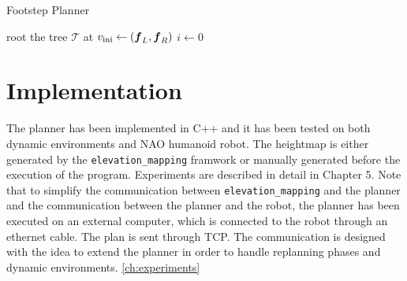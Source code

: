 \begin{algorithm}
  \caption{Footstep Planner}
  \label{alg:footstep-planner}
  root the tree $\mathcal{T}$ at $v_{\rm ini} \leftarrow ({\mbox{\boldmath $f$}}_L, {\mbox{\boldmath $f$}}_R)$\;
  $i \leftarrow 0$\;
\end{algorithm}

\section{Implementation}
The planner has been implemented in C++ and it has been tested on both dynamic 
environments and NAO humanoid robot. The heightmap is either generated by the 
\texttt{elevation\_mapping} framwork or manually generated before the execution 
of the program. Experiments are described in detail in Chapter 5. Note that to 
simplify the communication between \texttt{elevation\_mapping} and the planner 
and the communication between the planner and the robot, the planner has been 
executed on an external computer, which is connected to the robot through 
an ethernet cable. The plan is sent through TCP. The communication is designed 
with the idea to extend the planner in order to handle replanning phases and
dynamic environments.
\ref{ch:experiments} 
